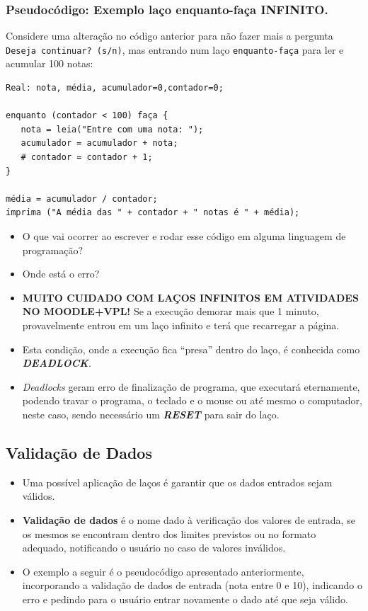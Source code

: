 \documentclass[12pt,a4paper]{article}
\providecommand{\tightlist}{%
      \setlength{\itemsep}{0pt}\setlength{\parskip}{0pt}}
\begin{document}
    \hypertarget{pseudocuxf3digo-exemplo-lauxe7o-enquanto-fauxe7a-infinito.}{%
\subsubsection{Pseudocódigo: Exemplo laço enquanto-faça
INFINITO.}\label{pseudocuxf3digo-exemplo-lauxe7o-enquanto-fauxe7a-infinito.}}

Considere uma alteração no código anterior para não fazer mais a
pergunta \texttt{Deseja\ continuar?\ (s/n)}, mas entrando num laço
\texttt{enquanto-faça} para ler e acumular 100 notas:

\begin{verbatim}
Real: nota, média, acumulador=0,contador=0;

enquanto (contador < 100) faça {
   nota = leia("Entre com uma nota: ");
   acumulador = acumulador + nota;
   # contador = contador + 1;
} 

média = acumulador / contador;
imprima ("A média das " + contador + " notas é " + média);
\end{verbatim}

    \begin{itemize}
\tightlist
\item
  O que vai ocorrer ao escrever e rodar esse código em alguma linguagem
  de programação?
\item
  Onde está o erro?
\item
  \textbf{MUITO CUIDADO COM LAÇOS INFINITOS EM ATIVIDADES NO
  MOODLE+VPL!} Se a execução demorar mais que 1 minuto, provavelmente
  entrou em um laço infinito e terá que recarregar a página.
\item
  Esta condição, onde a execução fica ``presa'' dentro do laço, é
  conhecida como \textbf{\emph{DEADLOCK}}.
\item
  \emph{Deadlocks} geram erro de finalização de programa, que executará
  eternamente, podendo travar o programa, o teclado e o mouse ou até
  mesmo o computador, neste caso, sendo necessário um
  \textbf{\emph{RESET}} para sair do laço.
\end{itemize}

    \hypertarget{validauxe7uxe3o-de-dados}{%
\subsection{Validação de Dados}\label{validauxe7uxe3o-de-dados}}

    \begin{itemize}
\item
  Uma possível aplicação de laços é garantir que os dados entrados sejam
  válidos.
\item
  \textbf{Validação de dados} é o nome dado à verificação dos valores de
  entrada, se os mesmos se encontram dentro dos limites previstos ou no
  formato adequado, notificando o usuário no caso de valores inválidos.
\item
  O exemplo a seguir é o pseudocódigo apresentado anteriormente,
  incorporando a validação de dados de entrada (nota entre 0 e 10),
  indicando o erro e pedindo para o usuário entrar novamente o dado até
  que seja válido.
\end{itemize}
\end{document}
